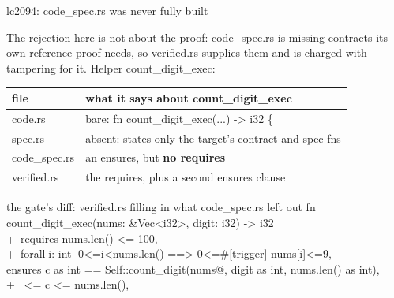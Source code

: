 \documentclass[aspectratio=169,10pt]{beamer}
\newcommand{\code}[1]{{\ttfamily #1}}
\begin{document}
\begin{frame}[fragile]{lc2094: code\_spec.rs was never fully built}

{\scriptsize The rejection here is not about the proof: \code{code\_spec.rs} is missing
contracts its own reference proof needs, so \code{verified.rs} supplies them and is charged
with tampering for it. Helper \code{count\_digit\_exec}:}

\vspace{4pt}
\begin{center}
{\tiny
\renewcommand{\arraystretch}{0.85}
\begin{tabular}{ll}
\toprule
\textbf{file} & \textbf{what it says about \code{count\_digit\_exec}} \\
\midrule
\code{code.rs}       & bare: \code{fn count\_digit\_exec(...) -> i32 \{} \\
\code{spec.rs}       & absent: states only the target's contract and \code{spec fn}s \\
\code{code\_spec.rs} & an \code{ensures}, but \textbf{no \code{requires}} \\
\code{verified.rs}   & the \code{requires}, plus a second \code{ensures} clause \\
\bottomrule
\end{tabular}
}
\end{center}

\vspace{5pt}
\begin{center}
\begin{codebox}[lgGrey]{the gate's diff: verified.rs filling in what code\_spec.rs left out}
{\ttfamily\tiny\setlength{\baselineskip}{7pt}
\phantom{+ }fn count\_digit\_exec(nums: \&Vec<i32>, digit: i32) -> i32\\[1pt]
{\color{lgGreen}+\ }requires nums.len() <= 100,\\[1pt]
{\color{lgGreen}+\ }\quad forall|i: int| 0<=i<nums.len() ==> 0<=\#[trigger] nums[i]<=9,\\[1pt]
\phantom{+ }ensures c as int == Self::count\_digit(nums@, digit as int, nums.len() as int),\\[1pt]
{\color{lgGreen}+\ } <= c <= nums.len(),
}
\end{codebox}
\end{center}

\end{frame}
\end{document}
